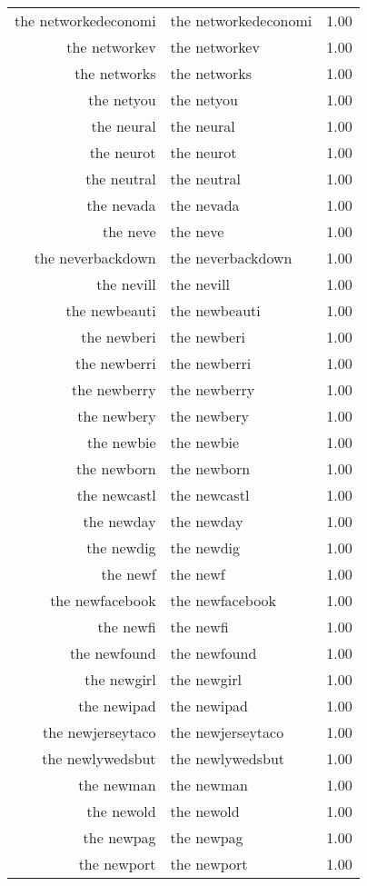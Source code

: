 \begin{table}[ht]
\begin{tabular}{rlr}
  the networkedeconomi & the networkedeconomi & 1.00 \\ 
  the networkev & the networkev & 1.00 \\ 
  the networks & the networks & 1.00 \\ 
  the netyou & the netyou & 1.00 \\ 
  the neural & the neural & 1.00 \\ 
  the neurot & the neurot & 1.00 \\ 
  the neutral & the neutral & 1.00 \\ 
  the nevada & the nevada & 1.00 \\ 
  the neve & the neve & 1.00 \\ 
  the neverbackdown & the neverbackdown & 1.00 \\ 
  the nevill & the nevill & 1.00 \\ 
  the newbeauti & the newbeauti & 1.00 \\ 
  the newberi & the newberi & 1.00 \\ 
  the newberri & the newberri & 1.00 \\ 
  the newberry & the newberry & 1.00 \\ 
  the newbery & the newbery & 1.00 \\ 
  the newbie & the newbie & 1.00 \\ 
  the newborn & the newborn & 1.00 \\ 
  the newcastl & the newcastl & 1.00 \\ 
  the newday & the newday & 1.00 \\ 
  the newdig & the newdig & 1.00 \\ 
  the newf & the newf & 1.00 \\ 
  the newfacebook & the newfacebook & 1.00 \\ 
  the newfi & the newfi & 1.00 \\ 
  the newfound & the newfound & 1.00 \\ 
  the newgirl & the newgirl & 1.00 \\ 
  the newipad & the newipad & 1.00 \\ 
  the newjerseytaco & the newjerseytaco & 1.00 \\ 
  the newlywedsbut & the newlywedsbut & 1.00 \\ 
  the newman & the newman & 1.00 \\ 
  the newold & the newold & 1.00 \\ 
  the newpag & the newpag & 1.00 \\ 
  the newport & the newport & 1.00 \\ 

\end{tabular}
\end{table}
